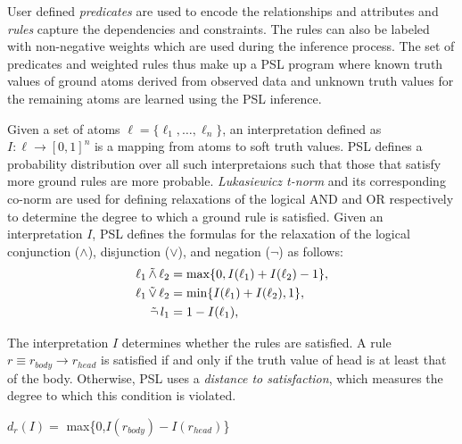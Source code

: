 User defined \emph{predicates} are used to encode the relationships and attributes and \emph{rules} capture the  dependencies and constraints.
The rules can also be
labeled with non-negative weights which are used during the inference process.
The set of predicates and weighted rules thus make up a PSL program where known truth values of ground atoms derived from observed data and unknown truth values for the remaining atoms are learned using the PSL inference.

Given a set of atoms 
$\ell = \{\ell_1,\ldots,\ell_n\}$,
an interpretation defined as 
$I : \ell \rightarrow [0,1]^n$
is a mapping from atoms to soft truth values.
PSL defines a probability distribution over all such interpretaions such that those that satisfy more ground rules are more probable.
\emph{Lukasiewicz t-norm} and its corresponding co-norm are used for defining relaxations of the logical AND and OR respectively to determine the degree to which a ground rule is satisfied.
Given an interpretation $\mathit{I}$, PSL defines the formulas for the relaxation of the logical conjunction ($\wedge$), disjunction ($\vee$), and negation ($\neg$) as follows:
\begin{align*}
\ell_1 \softand \ell_2 &= \max\{0, I(\ell_1) + I(\ell_2) - 1\},\\
\ell_1 \softor \ell_2 &= \min\{I(\ell_1) + I(\ell_2), 1\},\\
\softneg l_1 &= 1 - I(\ell_1),
\end{align*}  

{\color{red}
The interpretation $\mathit{I}$ determines whether the rules are
satisfied. A rule $\mathit{r} \equiv \mathit{r_{body}} \rightarrow
\mathit{r_{head}} $  is satisfied if and only if the truth value of head
is at least that of the body. Otherwise, PSL uses a \emph{distance to
satisfaction}, which measures the degree to which this condition is
violated.}
 \newline
\begin{center} 
 $\mathit{d_r}(\mathit{I}) =$ max\{0,$\mathit{I(r_{body})} - \mathit{I(r_{head})}$\}
 \end{center}

